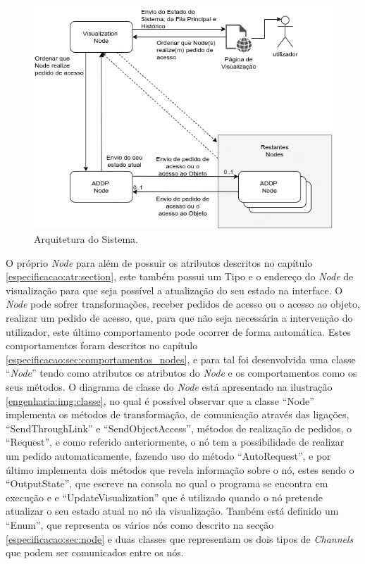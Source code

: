 \begin{figure}[h!]
\centering
\includegraphics[width=400pt]{arquitetura.png}
\caption{Arquitetura do Sistema.}
\label{engenharia:img:arquitetura}
\end{figure}


O próprio \emph{Node} para além de possuir os atributos descritos no capítulo \ref{especificacao:atr:section}, este também possui um Tipo e o endereço do \emph{Node} de visualização para que 
seja possível a atualização do seu estado na interface.
O \emph{Node} pode sofrer transformações, receber pedidos de acesso ou o acesso ao objeto, realizar um pedido de acesso, que, para que não seja necessária a intervenção
do utilizador, este último comportamento pode ocorrer de forma automática.
Estes comportamentos foram descritos no capítulo \ref{especificacao:sec:comportamentos_nodes}, e para tal foi desenvolvida uma classe ``\emph{Node}'' tendo como atributos os atributos do \emph{Node}
e os comportamentos como os seus métodos. O diagrama de classe do \emph{Node} está apresentado na ilustração \ref{engenharia:img:classe}, no qual é possível observar
que a classe ``Node'' implementa os métodos de transformação, de comunicação através das ligações, ``SendThroughLink'' e ``SendObjectAccess'', métodos de realização de pedidos, o ``Request'', 
e como referido anteriormente, o nó tem a possibilidade de realizar um pedido automaticamente, fazendo uso do método ``AutoRequest'', e por último implementa dois métodos que revela informação sobre o nó, estes sendo o ``OutputState'', que escreve na consola no qual o programa se encontra em execução e e ``UpdateVisualization'' que é utilizado quando o nó pretende atualizar
o seu estado atual no nó da visualização.
Também está definido um ``Enum'',  que representa os vários nós como descrito na secção
\ref{especificacao:sec:node} e duas classes que representam os dois tipos de \emph{Channels} que podem ser comunicados entre os nós.



